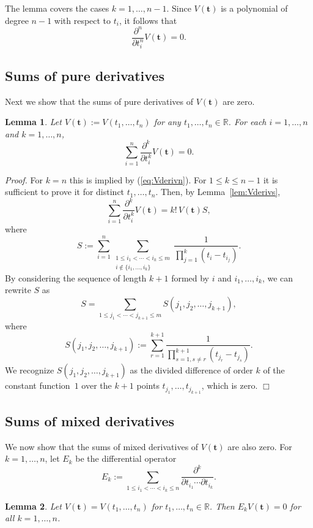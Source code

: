 \documentclass[12pt]{article}
\newcommand{\RR}{\mathbb{R}}
\def\bft{\mathbf{t}}
\newtheorem{lemma}{Lemma}
\newenvironment{proof}{\begin{trivlist}\item[]{\emph{Proof.}}}
               {\hfill$\Box$\end{trivlist}}
\begin{document}
The lemma covers the cases $k=1,\ldots,n-1$.
Since $V(\bft)$ is a polynomial of degree $n-1$
with respect to $t_i$, it follows that
\begin{equation}\label{eq:Vderivn}
\frac{\partial^n}{\partial t_i^n} V(\bft) = 0.
\end{equation}

\subsection{Sums of pure derivatives}
Next we show that the sums of pure derivatives of $V(\bft)$ are zero.
\begin{lemma}\label{lem:Vderivsums}
Let $V(\bft) := V(t_1,\ldots,t_n)$ for any $t_1,\ldots,t_n \in \RR$.
For each $i=1,\ldots,n$ and $k=1,\ldots,n$,
$$
\sum_{i=1}^n \frac{\partial^k}{\partial t_i^k} V(\bft) = 0.
$$
\end{lemma}

\begin{proof}
For $k=n$ this is implied by (\ref{eq:Vderivn}).
For $1 \le k \le n-1$
it is sufficient to prove it for distinct $t_1,\ldots,t_n$.
Then, by Lemma~\ref{lem:Vderivs},
$$
\sum_{i=1}^n \frac{\partial^k}{\partial t_i^k} V(\bft)
= k! \, V(\bft) S, $$
where
$$ S :=
\sum_{i=1}^n
\sum_{\substack{1 \le i_1 < \cdots < i_k \le m \\
	i \not\in \{i_1,\ldots,i_k\}}}
	\frac{1}{\prod_{j=1}^k(t_i-t_{i_j})}.
$$
By considering the sequence of length $k+1$
formed by $i$ and $i_1,\ldots,i_k$,
we can rewrite $S$ as
$$ S = \sum_{1 \le j_1 < \cdots < j_{k+1} \le m}
S(j_1,j_2,\ldots,j_{k+1}), $$
where
$$
S(j_1,j_2,\ldots,j_{k+1}) :=
\sum_{r=1}^{k+1}
\frac{1}{\prod_{s=1, s \ne r}^{k+1}(t_{j_r}-t_{j_s})}.
$$
We recognize $S(j_1,j_2,\ldots,j_{k+1})$
as the divided difference of order $k$ of the constant function~$1$
over the $k+1$ points $t_{j_1},\ldots,t_{j_{k+1}}$,
which is zero.
\end{proof}

\subsection{Sums of mixed derivatives}
We now show that the sums of mixed derivatives of $V(\bft)$ are also zero.
For $k=1,\ldots,n$, let $E_k$ be the differential operator
\begin{equation}\label{eq:Ek}
E_k := \sum_{1 \le i_1 < \cdots < i_k \le n}
\frac{\partial^k}{\partial t_{i_1} \cdots \partial t_{i_k}}.
\end{equation}
\begin{lemma}\label{lem:Vmixedderivsums}
Let $V(\bft) = V(t_1,\ldots,t_n)$ for $t_1,\ldots,t_n \in \RR$.
Then $E_k V(\bft) = 0$ for all $k=1,\ldots,n$.
\end{lemma}
\end{document}

